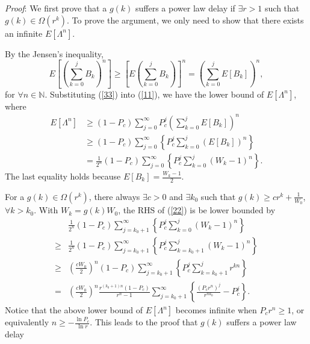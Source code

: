\documentclass[journal]{IEEEtran}
\begin{document}
\emph{Proof}: We first prove that a $g(k)$ suffers a power law delay if $\exists r>1$ such that $g(k)\in\Omega(r^k)$. To prove the argument, we only need to show that there exists an infinite $E\left[\Lambda^n\right]$.

By the Jensen's inequality,
\begin{equation}
\label{33}
E\left[\left(\sum_{k=0}^j B_k\right)^n\right] \geq \left[E\left(\sum_{k=0}^{j}B_k\right)\right]^n = \left(\sum_{k=0}^{j}E\left[B_k\right]\right)^n,
\end{equation}
for $\forall n\in \mathbb{N}$.
Substituting (\ref{33}) into (\ref{11}), we have the lower bound of $E[\Lambda^n]$, where
\begin{equation}
\label{22}
\begin{aligned}
E[\Lambda^n]&\geq\left(1-P_c\right)\sum_{j=0}^{\infty}P_c^j \left(\sum_{k=0}^{j}E\left[B_k\right]\right)^n\\
&\geq \left(1-P_c\right)\sum_{j=0}^{\infty}\left\{P_c^j \sum_{k=0}^{j}\left(E\left[B_k\right]\right)^n\right\}\\
&=\frac{1}{2^n}\left(1-P_c\right)\sum_{j=0}^{\infty}\left\{P_c^j \sum_{k=0}^{j}\left(W_k-1\right)^n\right\}.
\end{aligned}
\end{equation}
The last equality holds because $E\left[B_k\right]=\frac{W_k-1}{2}$.

For a $g(k)\in\Omega(r^k)$, there always $\exists c>0$ and $\exists k_0$ such that $g(k)\geq c r^k+\frac{1}{W_0}$, $\forall k>k_0$. With $W_k=g(k)W_0$, the RHS of (\ref{22}) is be lower bounded by
\begin{equation}
\label{36}
\begin{aligned}
&\frac{1}{2^n}\left(1-P_c\right)\sum_{j=k_0+1}^{\infty}\left\{P_c^j\sum_{k=0}^{j}\left(W_k-1\right)^n\right\}\\
\geq &\frac{1}{2^n}\left(1-P_c\right)\sum_{j=k_0+1}^{\infty}\left\{P_c^j \sum_{k=k_0+1}^{j}\left(W_k-1\right)^n \right\}\\
\geq & \left(\frac{cW_0}{2}\right)^n\left(1-P_c\right) \sum_{j=k_0+1}^{\infty} \left\{P_c^j \sum_{k=k_0+1}^{j}r^{kn} \right\}\\
= & \left(\frac{cW_0}{2}\right)^n\frac{r^{(k_0+1)n}\left(1-P_c\right)}{r^n-1}\sum_{j=k_0+1}^{\infty} \left\{\frac{\left(P_cr^n\right)^j}{r^{nk_0}} - P_c^j\right\}.
\end{aligned}
\end{equation}
Notice that the above lower bound of $E[\Lambda^n]$ becomes infinite when $P_cr^n\geq 1$, or equivalently $n\geq -\frac{\ln P_c}{\ln r}$. This leads to the proof that $g(k)$ suffers a power law delay
\end{document}
